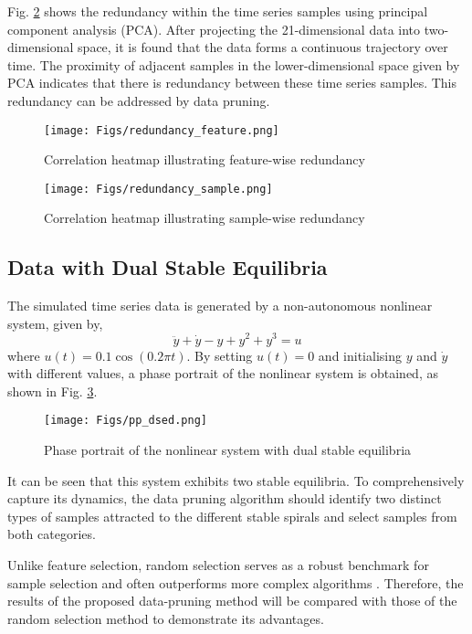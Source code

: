 \documentclass{article}
\begin{document}
Fig. \ref{fig:run_sam} shows the redundancy within the time series samples using principal component analysis (PCA).
After projecting the 21-dimensional data into two-dimensional space, it is found that the data forms a continuous trajectory over time.
The proximity of adjacent samples in the lower-dimensional space given by PCA indicates that there is redundancy between these time series samples. 
This redundancy can be addressed by data pruning.

\begin{figure}[htpb]
    \centering
    \texttt{[image: Figs/redundancy\_feature.png]}
    \caption{Correlation heatmap illustrating feature-wise redundancy}
    \label{fig:run_fea}
\end{figure}

\begin{figure}[htpb]
    \centering
    \texttt{[image: Figs/redundancy\_sample.png]}
    \caption{Correlation heatmap illustrating sample-wise redundancy}
    \label{fig:run_sam}
\end{figure}

\subsection{Data with Dual Stable Equilibria}
The simulated time series data is generated by a non-autonomous nonlinear system, given by,
\begin{equation*}
\ddot{y} + \dot{y} - y + y^2 + y^3 = u
\end{equation*}
where $u(t) = 0.1 \cos (0.2 \pi t)$. 
By setting $u(t)=0$ and initialising $y$ and $\dot{y}$ with different values, a phase portrait of the nonlinear system is obtained, as shown in Fig. \ref{fig:pp_dsed}.

\begin{figure}[htbp]
    \centering
    \texttt{[image: Figs/pp\_dsed.png]}
    \caption{Phase portrait of the nonlinear system with dual stable equilibria}
    \label{fig:pp_dsed}
\end{figure}

It can be seen that this system exhibits two stable equilibria. 
To comprehensively capture its dynamics, the data pruning algorithm should identify two distinct types of samples attracted to the different stable spirals and select samples from both categories.

Unlike feature selection, random selection serves as a robust benchmark for sample selection and often outperforms more complex algorithms \cite{ayed2023data}.
Therefore, the results of the proposed data-pruning method will be compared with those of the random selection method to demonstrate its advantages.
\end{document}
